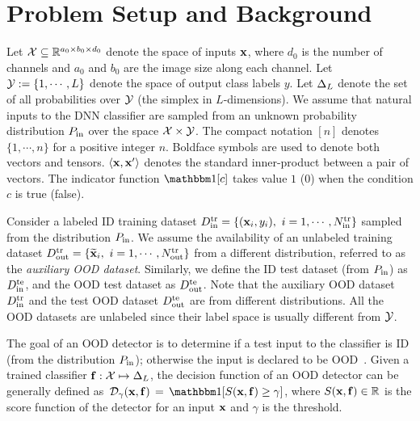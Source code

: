 \section{Problem Setup and Background}
Let $\mathcal{X} \subseteq \mathbb{R}^{a_0 \times b_0 \times d_0}$ denote the space of inputs $\mathbf{x}$, where $d_0$ is the number of channels and $a_0$ and $b_0$ are the image size along each channel.
Let $\mathcal{Y} := \{1, \cdots, L\}$ denote the space of output class labels $y$.
Let $\Delta_L$ denote the set of all probabilities over $\mathcal{Y}$ (the simplex in $L$-dimensions).
We assume that natural inputs to the DNN classifier are sampled from an unknown probability distribution $P_{\textrm{in}}$ over the space $\mathcal{X} \times \mathcal{Y}$.  
The  compact notation $[n]$ denotes $\{1, \cdots, n\}$ for a positive integer $n$.
Boldface symbols are used to denote both vectors and tensors.
$\langle\mathbf{x}, \mathbf{x}^\prime\rangle$ denotes the standard inner-product between a pair of vectors. 
The indicator function $\indicator[c]$ takes value $1$ ($0$) when the condition $c$ is true (false).

Consider a labeled ID training dataset $D_{\textrm{in}}^{\textrm{tr}} = \{(\mathbf{x}_i, y_i), ~i = 1, \cdots, N_{\textrm{in}}^{\textrm{tr}}\}$ sampled from the distribution $P_{\textrm{in}}$.
We assume the availability of an unlabeled training dataset $D_{\textrm{out}}^{\textrm{tr}} = \{\widetilde{\mathbf{x}}_i, ~i = 1, \cdots, N_{\textrm{out}}^{\textrm{tr}}\}$ from a different distribution, referred to as the {\em auxiliary OOD dataset}.
Similarly, we define the ID test dataset (from $P_{\textrm{in}}$) as $D_{\textrm{in}}^{\textrm{te}}$, and the OOD test dataset as $D_{\textrm{out}}^{\textrm{te}}$.
Note that the auxiliary OOD dataset $D_{\textrm{in}}^{\textrm{tr}}$ and the test OOD dataset $D_{\textrm{out}}^{\textrm{te}}$ are from different distributions.
All the OOD datasets are unlabeled since their label space is usually different from $\mathcal{Y}$. 

The goal of an OOD detector is to determine if a test input to the classifier is ID (\ie from the distribution $P_{\textrm{in}}$); otherwise the input is declared to be OOD~\citep{yang2021survey}.
Given a trained classifier $\mathbf{f} : \mathcal{X} \mapsto \Delta_L$, the decision function of an OOD detector can be generally defined as $\,\calD_\gamma(\bfx, \bff) \,=\, \indicator[S(\bfx, \bff) \geq \gamma]$, where $S(\mathbf{x}, \mathbf{f}) \in \mathbb{R}$ is the score function of the detector for an input $\mathbf{x}$ and $\gamma$ is the threshold.
%
\iffalse

